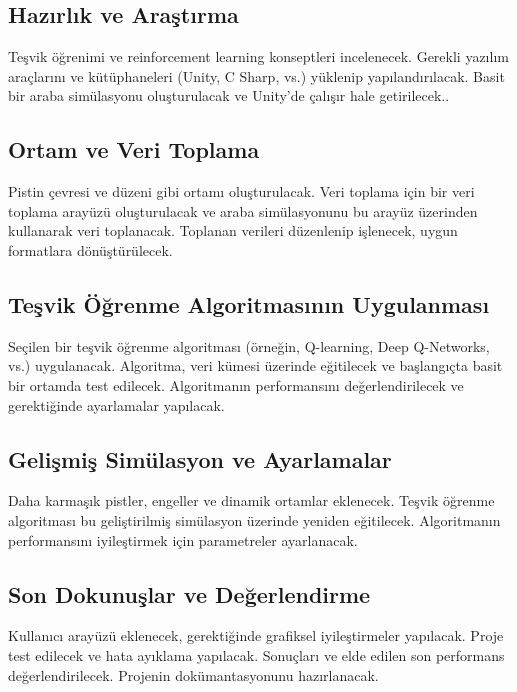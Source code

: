 \documentclass{article}
\begin{document}
\subsection{Hazırlık ve Araştırma}
Teşvik öğrenimi ve reinforcement learning konseptleri incelenecek. Gerekli yazılım araçlarını ve kütüphaneleri (Unity, C Sharp, vs.) yüklenip yapılandırılacak. Basit bir araba simülasyonu oluşturulacak ve Unity'de çalışır hale getirilecek..\\[15pt]

\subsection{Ortam ve Veri Toplama}
Pistin çevresi ve düzeni gibi ortamı oluşturulacak. Veri toplama için bir veri toplama arayüzü oluşturulacak ve araba simülasyonunu bu arayüz üzerinden kullanarak veri toplanacak. Toplanan verileri düzenlenip işlenecek, uygun formatlara dönüştürülecek.\\[15pt]

\subsection{Teşvik Öğrenme Algoritmasının Uygulanması}
Seçilen bir teşvik öğrenme algoritması (örneğin, Q-learning, Deep Q-Networks, vs.) uygulanacak. Algoritma, veri kümesi üzerinde eğitilecek ve başlangıçta basit bir ortamda test edilecek. Algoritmanın performansını değerlendirilecek ve gerektiğinde ayarlamalar yapılacak.\\[15pt]

\subsection{Gelişmiş Simülasyon ve Ayarlamalar}
Daha karmaşık pistler, engeller ve dinamik ortamlar eklenecek. Teşvik öğrenme algoritması bu geliştirilmiş simülasyon üzerinde yeniden eğitilecek. Algoritmanın performansını iyileştirmek için parametreler ayarlanacak.\\[15pt]

\subsection{Son Dokunuşlar ve Değerlendirme}
Kullanıcı arayüzü eklenecek, gerektiğinde grafiksel iyileştirmeler yapılacak.
Proje test edilecek ve hata ayıklama yapılacak.
Sonuçları ve elde edilen son performans değerlendirilecek.
Projenin dokümantasyonunu hazırlanacak.\\[15pt]
\end{document}
